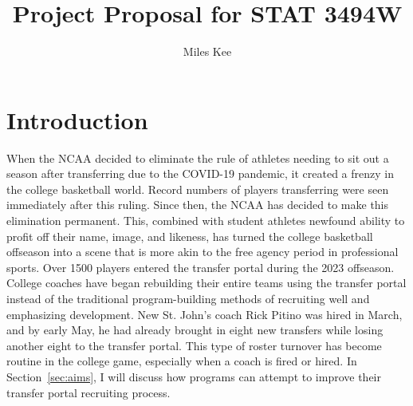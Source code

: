 \documentclass[12pt]{article}
\title{Project Proposal for STAT 3494W}
\author{Miles Kee}
\begin{document}
\maketitle

\section{Introduction}
\label{sec:intro}
When the NCAA decided to eliminate the rule of athletes needing to sit out a season after transferring due to the COVID-19 pandemic, it created a frenzy in the college basketball world. Record numbers of players transferring were seen immediately after this ruling. Since then, the NCAA has decided to make this elimination permanent. This, combined with student athletes newfound ability to profit off their name, image, and likeness, has turned the college basketball offseason into a scene that is more akin to the free agency period in professional sports. Over 1500 players entered the transfer portal during the 2023 offseason. College coaches have began rebuilding their entire teams using the transfer portal instead of the traditional program-building methods of recruiting well and emphasizing development. New St. John's coach Rick Pitino was hired in March, and by early May, he had already brought in eight new transfers while losing another eight to the transfer portal. This type of roster turnover has become routine in the college game, especially when a coach is fired or hired. In Section~\ref{sec:aims}, I will discuss how programs can attempt to improve their transfer portal recruiting process.
\end{document}
